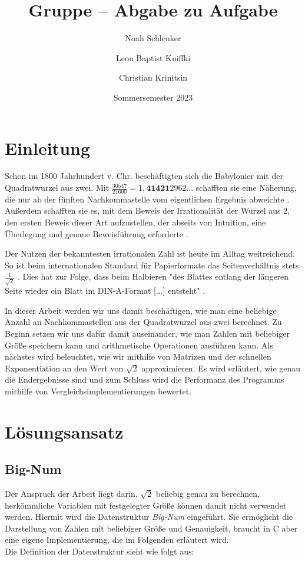 \documentclass[course=erap]{aspdoc}
\author{Noah Schlenker \and Leon Baptist Kniffki \and Christian Krinitsin}
\date{Sommersemester 2023} %
\title{Gruppe \theGroup{} -- Abgabe zu Aufgabe \theNumber}
\begin{document}
\maketitle

\section{Einleitung} \label{sec:einleitung}

Schon im 1800 Jahrhundert v. Chr. beschäftigten sich die Babylonier mit der Quadratwurzel aus zwei. Mit $\tfrac {30547}{21600} = 1,\textbf{41421}2962\dots$ schafften sie eine Näherung, die nur
ab der fünften Nachkommastelle vom eigentlichen Ergebnis abweichte \cite{quadratwurzel_aus_2}. Außerdem schafften sie es, mit dem Beweis der Irrationalität der Wurzel aus 2, den ersten Beweis 
dieser Art aufzustellen, der abseits von Intuition, eine Überlegung und genaue Beweisführung erforderte \cite{lemonde_wurzel_2}. \par

Der Nutzen der bekanntesten irrationalen Zahl ist heute im Alltag weitreichend. So ist beim internationalen Standard für Papierformate das Seitenverhältnis stets $\frac{1}{\sqrt{2}}$ \cite{papierformat}. 
Dies hat zur Folge, dass beim Halbieren "des Blattes entlang der längeren Seite wieder ein Blatt im DIN-A-Format [...] entsteht" \cite{quadratwurzel_aus_2}. \par

In dieser Arbeit werden wir uns damit beschäftigen, wie man eine beliebige Anzahl an Nachkommastellen aus der Quadratwurzel aus zwei berechnet. Zu Beginn setzen wir uns dafür damit auseinander, 
wie man Zahlen mit beliebiger Größe speichern kann und arithmetische Operationen ausführen kann. Als nächstes wird beleuchtet, wie wir mithilfe von Matrizen und der schnellen Exponentiation
an den Wert von $\sqrt{2}$ approximieren. Es wird erläutert, wie genau die Endergebnisse sind und zum Schluss wird die Performanz des Programms mithilfe von Vergleichsimplementierungen bewertet.

\section{Lösungsansatz} \label{sec:loesungsansatz}
\subsection{Big-Num} \label{sec:bignum}
Der Anspruch der Arbeit liegt darin, $\sqrt{2}$ beliebig genau zu berechnen, herkömmliche Variablen mit festgelegter Größe können damit nicht verwendet werden. Hiermit wird die Datenstruktur \textit{Big-Num} eingeführt.
Sie ermöglicht die Darstellung von Zahlen mit beliebiger Größe und Genauigkeit, braucht in C aber eine eigene Implementierung, die im Folgenden erläutert wird. \\
Die Definition der Datenstruktur sieht wie folgt aus:
\end{document}
